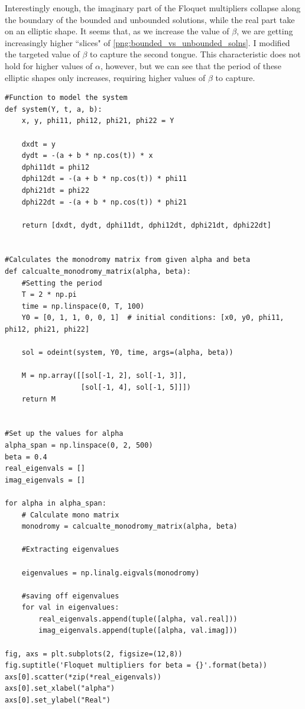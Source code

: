 \documentclass[12pt]{article}
\newcommand{\jump}{\vspace{5mm}}
\begin{document}
\begin{enumerate}[]
\begin{solution}
Interestingly enough, the imaginary part of the Floquet multipliers collapse along the boundary of the bounded and unbounded solutions, while the real part take on an elliptic shape. It seems that, as we increase the value of $\beta$, we are getting increasingly higher ``slices" of \ref{png:bounded_vs_unbounded_solns}. I modified the targeted value of $\beta$ to capture the second tongue. This characteristic does not hold for higher values of $\alpha$, however, but we can see that the period of these elliptic shapes only increases, requiring higher values of $\beta$ to capture. 

\end{solution}

\jump
\begin{lstlisting}
#Function to model the system
def system(Y, t, a, b):
    x, y, phi11, phi12, phi21, phi22 = Y

    dxdt = y
    dydt = -(a + b * np.cos(t)) * x
    dphi11dt = phi12
    dphi12dt = -(a + b * np.cos(t)) * phi11
    dphi21dt = phi22
    dphi22dt = -(a + b * np.cos(t)) * phi21

    return [dxdt, dydt, dphi11dt, dphi12dt, dphi21dt, dphi22dt]


#Calculates the monodromy matrix from given alpha and beta
def calcualte_monodromy_matrix(alpha, beta):
    #Setting the period
    T = 2 * np.pi
    time = np.linspace(0, T, 100)
    Y0 = [0, 1, 1, 0, 0, 1]  # initial conditions: [x0, y0, phi11, phi12, phi21, phi22]

    sol = odeint(system, Y0, time, args=(alpha, beta))

    M = np.array([[sol[-1, 2], sol[-1, 3]],
                  [sol[-1, 4], sol[-1, 5]]])
    return M


#Set up the values for alpha
alpha_span = np.linspace(0, 2, 500)
beta = 0.4
real_eigenvals = []
imag_eigenvals = []

for alpha in alpha_span:
    # Calculate mono matrix
    monodromy = calcualte_monodromy_matrix(alpha, beta)

    #Extracting eigenvalues

    eigenvalues = np.linalg.eigvals(monodromy)

    #saving off eigenvalues
    for val in eigenvalues: 
        real_eigenvals.append(tuple([alpha, val.real]))
        imag_eigenvals.append(tuple([alpha, val.imag]))
        
fig, axs = plt.subplots(2, figsize=(12,8))
fig.suptitle('Floquet multipliers for beta = {}'.format(beta))
axs[0].scatter(*zip(*real_eigenvals))
axs[0].set_xlabel("alpha")
axs[0].set_ylabel("Real")


\end{lstlisting}
\end{enumerate}
\end{document}
